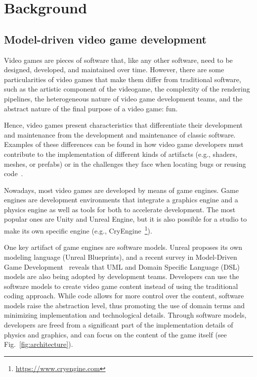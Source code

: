 \section{Background} \label{sec:Background}

\subsection{Model-driven video game development}

Video games are pieces of software that, like any other software, need to be designed, developed, and maintained over time. However, there are some particularities of video games that make them differ from traditional software, such as the artistic component of the videogame, the complexity of the rendering pipelines, the heterogeneous nature of video game development teams, and the abstract nature of the final purpose of a video game: fun. 

Hence, video games present characteristics that differentiate their development and maintenance from the development and maintenance of classic software. Examples of these differences can be found in how video game developers must contribute to the implementation of different kinds of artifacts (e.g., shaders, meshes, or prefabs) or in the challenges they face when locating bugs or reusing code~\cite{pascarella2018video, chueca2023consolidation}.

Nowadays, most video games are developed by means of game engines. Game engines are development environments that integrate a graphics engine and a physics engine as well as tools for both to accelerate development. The most popular ones are Unity and Unreal Engine, but it is also possible for a studio to make its own specific engine (e.g., CryEngine~\footnote{\url{https://www.cryengine.com}}). 

One key artifact of game engines are software models. Unreal proposes its own modeling language (Unreal Blueprints), and a recent survey in Model-Driven Game Development~\cite{zhu2019model} reveals that UML and Domain Specific Language (DSL) models are also being adopted by development teams. Developers can use the software models to create video game content instead of using the traditional coding approach. While code allows for more control over the content, software models raise the abstraction level, thus promoting the use of domain terms and minimizing implementation and technological details. Through software models, developers are freed from a significant part of the implementation details of physics and graphics, and can focus on the content of the game itself (see Fig.~\ref{fig:architecture}).

